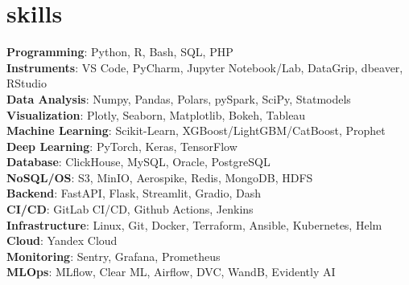 \section{skills}
 \begin{itemize}[leftmargin=0.15in, label={}]
    {\item{
     \textbf{Programming}{: Python, R, Bash, SQL, PHP} \\
     \textbf{Instruments}{: VS Code, PyCharm, Jupyter Notebook/Lab, DataGrip, dbeaver, RStudio} \\
     \textbf{Data Analysis}{: Numpy, Pandas, Polars, pySpark, SciPy, Statmodels} \\
     \textbf{Visualization}{: Plotly, Seaborn, Matplotlib, Bokeh, Tableau} \\
     \textbf{Machine Learning}{: Scikit-Learn, XGBoost/LightGBM/CatBoost, Prophet} \\
     \textbf{Deep Learning}{: PyTorch, Keras, TensorFlow} \\
     \textbf{Database}{: ClickHouse, MySQL, Oracle, PostgreSQL} \\
     \textbf{NoSQL/OS}{: S3, MinIO, Aerospike, Redis, MongoDB, HDFS} \\
     \textbf{Backend}{: FastAPI, Flask, Streamlit, Gradio, Dash} \\
     \textbf{CI/CD}{: GitLab CI/CD, Github Actions, Jenkins} \\
     \textbf{Infrastructure}{: Linux, Git, Docker, Terraform, Ansible, Kubernetes, Helm} \\
     \textbf{Cloud}{: Yandex Cloud} \\
     \textbf{Monitoring}{: Sentry, Grafana, Prometheus} \\
     \textbf{MLOps}{: MLflow, Clear ML, Airflow, DVC, WandB, Evidently AI} \\
    }}
 \end{itemize}